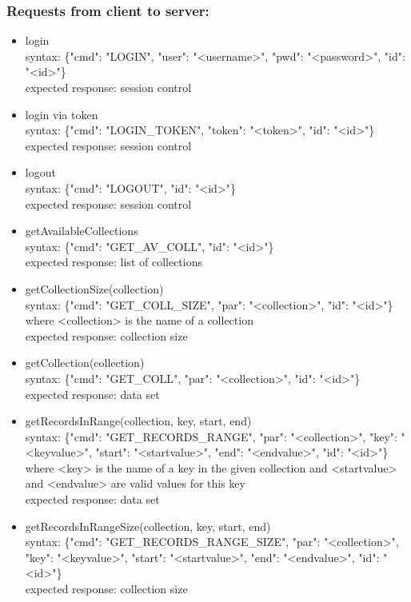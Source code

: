 \documentclass[oneside, english, final]{design}
\begin{document}
\subsubsection{Requests from client to server:}
\begin{itemize}
	\item{login}
	      \\
	      syntax: \{"cmd": "LOGIN", "user": "<username>", "pwd": "<password>", "id": "<id>"\} \\
	      expected response: session control

	\item{login via token}
	      \\
	      syntax: \{"cmd": "LOGIN\_TOKEN", "token": "<token>", "id": "<id>"\} \\
	      expected response: session control

	\item{logout}
	      \\
	      syntax: \{"cmd": "LOGOUT", "id": "<id>"\} \\
	      expected response: session control

	\item{getAvailableCollections}
	      \\
	      syntax: \{"cmd": "GET\_AV\_COLL", "id": "<id>"\} \\
	      expected response: list of collections

	\item{getCollectionSize(collection)}
	      \\
	      syntax: \{"cmd": "GET\_COLL\_SIZE", "par": "<collection>", "id": "<id>"\} \\
	      where <collection> is the name of a collection\\
	      expected response: collection size

	\item{getCollection(collection)}
	      \\
	      syntax: \{"cmd": "GET\_COLL", "par": "<collection>", "id": "<id>"\} \\
	      expected response: data set

	\item{getRecordsInRange(collection, key, start, end)}
	      \\
	      syntax: \{"cmd": "GET\_RECORDS\_RANGE", "par": "<collection>", "key": "<keyvalue>", "start": "<startvalue>", "end": "<endvalue>", "id": "<id>"\} \\
	      where <key> is the name of a key in the given collection and <startvalue> and <endvalue> are valid values for this key\\
	      expected response: data set

	\item{getRecordsInRangeSize(collection, key, start, end)}
	      \\
	      syntax: \{"cmd": "GET\_RECORDS\_RANGE\_SIZE", "par": "<collection>", "key": "<keyvalue>", "start": "<startvalue>", "end": "<endvalue>", "id": "<id>"\} \\
	      expected response: collection size

\end{itemize}
\end{document}
